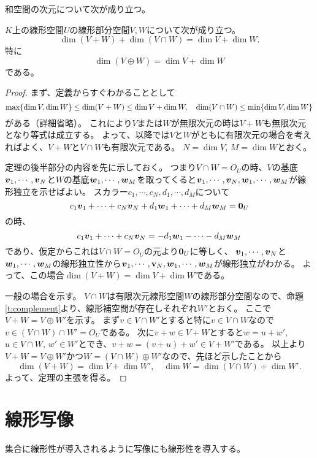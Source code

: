 和空間の次元について次が成り立つ。

\begin{theorem}[和空間の次元]
$K$上の線形空間$U$の線形部分空間$V, W$について次が成り立つ。
$$
\dim(V+W)+\dim(V\cap W) = \dim V+\dim W.
$$
特に
$$
\dim(V\oplus W) = \dim V+\dim W
$$
である。
\end{theorem}

\begin{proof}
まず、定義からすぐわかることとして
$$
\max\{ \dim V, \dim W \} \le \dim(V+W) \le \dim V+\dim W,
\quad \dim(V\cap W) \le \min\{ \dim V, \dim W \}
$$
がある（詳細省略）。
これにより$V$または$W$が無限次元の時は$V+W$も無限次元となり等式は成立する。
よって、以降では$V$と$W$がともに有限次元の場合を考えればよく、$V+W$と$V\cap W$も有限次元である。
$N = \dim V$, $M = \dim W$とおく。

定理の後半部分の内容を先に示しておく。
つまり$V\cap W = O_U$の時、$V$の基底$\vb*{v}_1, \cdots, \vb*{v}_N$と$W$の基底$\vb*{w}_1, \cdots, \vb*{w}_M$を取ってくると$\vb*{v}_1, \cdots, \vb*{v}_N, \vb*{w}_1, \cdots, \vb*{w}_M$が線形独立を示せばよい。
スカラー$c_1, \cdots, c_N, d_1, \cdots, d_M$について
$$
c_1\vb*{v}_1+\cdots+c_N\vb*{v}_N+d_1\vb*{w}_1+\cdots+d_M\vb*{w}_M = \vb*{0}_U
$$
の時、
$$
c_1\vb*{v}_1+\cdots+c_N\vb*{v}_N = -d_1\vb*{w}_1-\cdots-d_M\vb*{w}_M
$$
であり、仮定からこれは$V\cap W = O_U$の元より$\vb*{0}_U$に等しく、
$\vb*{v}_1, \cdots, \vb*{v}_N$と$\vb*{w}_1, \cdots, \vb*{w}_M$の線形独立性から$\vb*{v}_1, \cdots, \vb{v}_N, \vb*{w}_1, \cdots, \vb*{w}_M$が線形独立がわかる。
よって、この場合$\dim(V+W) = \dim V+\dim W$である。

一般の場合を示す。
$V\cap W$は有限次元線形空間$W$の線形部分空間なので、命題\ref{t:complement}より、線形補空間が存在しそれぞれ$W'$とおく。
ここで$V+W = V\oplus W'$を示す。
まず$v \in V\cap W'$とすると特に$v \in V\cap W$なので$v \in (V\cap W)\cap W' = O_U$である。
次に$v+w \in V+W$とすると$w = u+w'$, $u \in V\cap W$, $w' \in W'$とでき、$v+w = (v+u)+w' \in V+W'$である。
以上より$V+W = V\oplus W'$かつ$W = (V\cap W)\oplus W'$なので、先ほど示したことから
$$
\dim(V+W) = \dim V+\dim W',
\quad \dim W = \dim(V\cap W)+\dim W'.
$$
よって、定理の主張を得る。
\end{proof}

\section{線形写像}

集合に線形性が導入されるように写像にも線形性を導入する。

